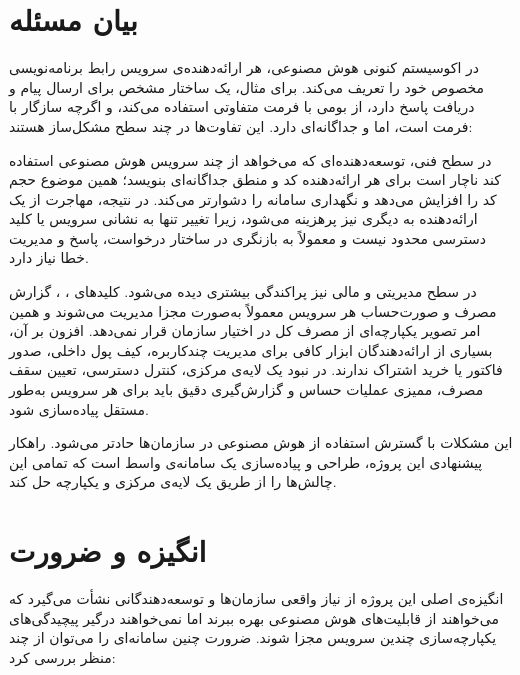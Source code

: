 \section{بیان مسئله}
\label{sec:problem}

در اکوسیستم کنونی هوش مصنوعی، هر ارائه‌دهنده‌ی سرویس رابط برنامه‌نویسی
مخصوص خود را تعریف می‌کند. برای مثال،  یک ساختار مشخص برای
ارسال پیام و دریافت پاسخ دارد،  از  بومی 
با فرمت متفاوتی استفاده می‌کند، و  اگرچه سازگار با فرمت 
است، اما  و  جداگانه‌ای دارد.
این تفاوت‌ها در چند سطح مشکل‌ساز هستند:

در سطح فنی، توسعه‌دهنده‌ای که می‌خواهد از چند سرویس هوش مصنوعی استفاده
کند ناچار است برای هر ارائه‌دهنده کد و منطق جداگانه‌ای بنویسد؛ همین موضوع
حجم کد را افزایش می‌دهد و نگهداری سامانه را دشوارتر می‌کند. در نتیجه،
مهاجرت از یک ارائه‌دهنده به دیگری نیز پرهزینه می‌شود، زیرا تغییر تنها به
نشانی سرویس یا کلید دسترسی محدود نیست و معمولاً به بازنگری در ساختار
درخواست، پاسخ و مدیریت خطا نیاز دارد.

در سطح مدیریتی و مالی نیز پراکندگی بیشتری دیده می‌شود. کلیدهای ،
، گزارش مصرف و صورت‌حساب هر سرویس معمولاً
به‌صورت مجزا مدیریت می‌شوند و همین امر تصویر یکپارچه‌ای از مصرف کل در
اختیار سازمان قرار نمی‌دهد. افزون بر آن، بسیاری از ارائه‌دهندگان ابزار
کافی برای مدیریت چندکاربره، کیف پول داخلی، صدور فاکتور یا خرید اشتراک
ندارند. در نبود یک لایه‌ی مرکزی، کنترل دسترسی، تعیین سقف مصرف، ممیزی
عملیات حساس و گزارش‌گیری دقیق باید برای هر سرویس به‌طور مستقل
پیاده‌سازی شود.

این مشکلات با گسترش استفاده از هوش مصنوعی در سازمان‌ها حادتر می‌شود.
راهکار پیشنهادی این پروژه، طراحی و پیاده‌سازی یک سامانه‌ی واسط است که
تمامی این چالش‌ها را از طریق یک لایه‌ی مرکزی و یکپارچه حل کند.

\section{انگیزه و ضرورت}
\label{sec:motivation}

انگیزه‌ی اصلی این پروژه از نیاز واقعی سازمان‌ها و توسعه‌دهندگانی نشأت
می‌گیرد که می‌خواهند از قابلیت‌های هوش مصنوعی بهره ببرند اما نمی‌خواهند
درگیر پیچیدگی‌های یکپارچه‌سازی چندین سرویس مجزا شوند. ضرورت چنین
سامانه‌ای را می‌توان از چند منظر بررسی کرد:

